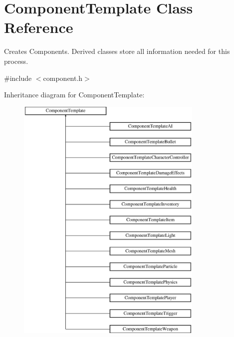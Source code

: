 \hypertarget{classComponentTemplate}{
\section{\-Component\-Template \-Class \-Reference}
\label{d9/d38/classComponentTemplate}
}


\-Creates \-Components. \-Derived classes store all information needed for this process.  




{\ttfamily \#include $<$component.\-h$>$}

\-Inheritance diagram for \-Component\-Template\-:\begin{figure}[H]
\begin{center}
\leavevmode
\includegraphics[height=12.000000cm]{d9/d38/classComponentTemplate}
\end{center}
\end{figure}
